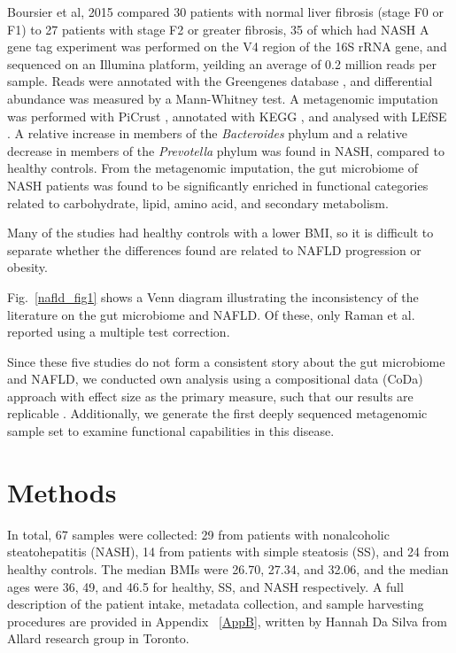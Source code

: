 Boursier et al, 2015 \cite{boursier2016severity} compared 30 patients with normal liver fibrosis (stage F0 or F1) to 27 patients with stage F2 or greater fibrosis, 35 of which had NASH A gene tag experiment was performed on the V4 region of the 16S rRNA gene, and sequenced on an Illumina platform, yeilding an average of 0.2 million reads per sample. Reads were annotated with the Greengenes database \cite{desantis2006greengenes}, and differential abundance was measured by a Mann-Whitney test. A metagenomic imputation was performed with PiCrust \cite{langille2013predictive}, annotated with KEGG \cite{kanehisa2000kegg}, and analysed with LEfSE \cite{segata2011metagenomic}. A relative increase in members of the \textit{Bacteroides} phylum and a relative decrease in members of the \textit{Prevotella} phylum was found in NASH, compared to healthy controls. From the metagenomic imputation, the gut microbiome of NASH patients was found to be significantly enriched in functional categories related to carbohydrate, lipid, amino acid, and secondary metabolism.

Many of the studies had healthy controls with a lower BMI, so it is difficult to separate whether the differences found are related to NAFLD progression or obesity.

Fig.~\ref{nafld_fig1} shows a Venn diagram illustrating the inconsistency of the literature on the gut microbiome and NAFLD. Of these, only Raman et al. \cite{raman2013fecal} reported using a multiple test correction.

Since these five studies do not form a consistent story about the gut microbiome and NAFLD, we conducted own analysis using a compositional data (CoDa) approach with effect size as the primary measure, such that our results are replicable \cite{halsey2015fickle}. Additionally, we generate the first deeply sequenced metagenomic sample set to examine functional capabilities in this disease.

\FloatBarrier

\section{Methods}
In total, 67 samples were collected: 29 from patients with nonalcoholic steatohepatitis (NASH), 14 from patients with simple steatosis (SS), and 24 from healthy controls. The median BMIs were 26.70, 27.34, and 32.06, and the median ages were 36, 49, and 46.5 for healthy, SS, and NASH respectively. A full description of the patient intake, metadata collection, and sample harvesting procedures are provided in Appendix ~\ref{AppB}, written by Hannah Da Silva from Allard research group in Toronto.

